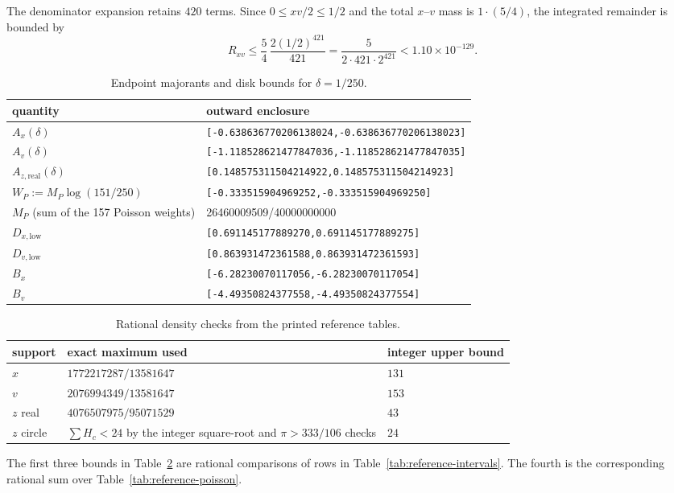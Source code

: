 \documentclass{amsart}
\numberwithin{equation}{section}
\numberwithin{table}{section}
\begin{document}
The denominator expansion retains $420$ terms. Since $0\le xv/2\le1/2$ and the total $x$--$v$ mass is $1\cdot(5/4)$, the integrated remainder is bounded by
\[
 R_{xv}\le\frac54\,\frac{2(1/2)^{421}}{421}
 =\frac{5}{2\cdot421\cdot2^{421}}<1.10\times10^{-129}.
\]
\begin{table}[ht]
\centering\footnotesize\renewcommand{\arraystretch}{1.2}\setlength{\tabcolsep}{8pt}
\caption{Endpoint majorants and disk bounds for $\delta=1/250$.}
\label{tab:endpoint-certificate}
\begin{tabular}{@{}p{}p{}@{}}
\hline quantity & outward enclosure\\\hline
$A_x(\delta)$ & \texttt{[-0.638636770206138024,-0.638636770206138023]}\\
$A_v(\delta)$ & \texttt{[-1.118528621477847036,-1.118528621477847035]}\\
$A_{z,\mathrm{real}}(\delta)$ & \texttt{[0.148575311504214922,0.148575311504214923]}\\
$W_P:=M_P\log(151/250)$ & \texttt{[-0.333515904969252,-0.333515904969250]}\\
$M_P$ (sum of the 157 Poisson weights) & 26460009509/40000000000\\
$D_{x,\mathrm{low}}$ & \texttt{[0.691145177889270,0.691145177889275]}\\
$D_{v,\mathrm{low}}$ & \texttt{[0.863931472361588,0.863931472361593]}\\
$B_x$ & \texttt{[-6.28230070117056,-6.28230070117054]}\\
$B_v$ & \texttt{[-4.49350824377558,-4.49350824377554]}\\
\hline
\end{tabular}
\end{table}
\begin{table}[ht]
\centering\footnotesize\renewcommand{\arraystretch}{1.2}\setlength{\tabcolsep}{8pt}
\caption{Rational density checks from the printed reference tables.}
\label{tab:density-certificate}
\begin{tabular}{@{}lll@{}}
\hline support & exact maximum used & integer upper bound\\\hline
$x$ & $1772217287/13581647$ & $131$\\
$v$ & $2076994349/13581647$ & $153$\\
$z$ real & $4076507975/95071529$ & $43$\\
$z$ circle & $\sum H_c<24$ by the integer square-root and $\pi>333/106$ checks & $24$\\
\hline
\end{tabular}
\end{table}
The first three bounds in Table~\ref{tab:density-certificate} are rational comparisons of rows in
Table~\ref{tab:reference-intervals}. The fourth is the corresponding rational
sum over Table~\ref{tab:reference-poisson}.
\end{document}
